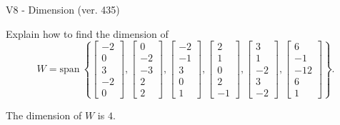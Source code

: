 \begin{exercise}
  \begin{exerciseTitle}V8 - Dimension (ver. 435)\end{exerciseTitle}
  \begin{exerciseStatement}
    Explain how to find the dimension of 
\[W=\mathrm{span}\ \left\{\left[\begin{array}{r}
-2 \\
0 \\
3 \\
-2 \\
0
\end{array}\right] , \left[\begin{array}{r}
0 \\
-2 \\
-3 \\
2 \\
2
\end{array}\right] , \left[\begin{array}{r}
-2 \\
-1 \\
3 \\
0 \\
1
\end{array}\right] , \left[\begin{array}{r}
2 \\
1 \\
0 \\
2 \\
-1
\end{array}\right] , \left[\begin{array}{r}
3 \\
1 \\
-2 \\
3 \\
-2
\end{array}\right] , \left[\begin{array}{r}
6 \\
-1 \\
-12 \\
6 \\
1
\end{array}\right]\right\}.\]



  \end{exerciseStatement}
  \begin{exerciseAnswer}
   The dimension of \(W\) is  \(4\).
  


  \end{exerciseAnswer}
\end{exercise}